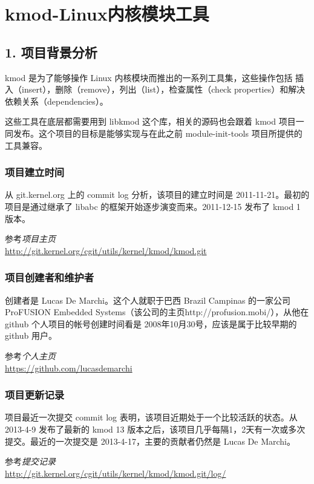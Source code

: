 \documentclass[11pt,a4paper]{article}
\begin{document}
\section{kmod-Linux内核模块工具}

\subsection{1. 项目背景分析}

kmod 是为了能够操作 Linux 内核模块而推出的一系列工具集，这些操作包括
插入（insert），删除（remove），列出（list），检查属性（check
properties）和解决依赖关系（dependencies）。

这些工具在底层都需要用到 libkmod 这个库，相关的源码也会跟着 kmod
项目一同发布。这个项目的目标是能够实现与在此之前 module-init-tools
项目所提供的工具兼容。

\subsubsection{项目建立时间}

从 git.kernel.org 上的 commit log 分析，该项目的建立时间是
2011-11-21。最初的项目是通过继承了 libabc
的框架开始逐步演变而来。2011-12-15 发布了 kmod 1 版本。

参考\emph{项目主页}\\\url{http://git.kernel.org/cgit/utils/kernel/kmod/kmod.git}

\subsubsection{项目创建者和维护者}

创建者是 Lucas De Marchi。这个人就职于巴西 Brazil Campinas
的一家公司ProFUSION Embedded
Systems（该公司的主页http://profusion.mobi/），从他在 github
个人项目的帐号创建时间看是 2008年10月30号，应该是属于比较早期的 github
用户。

参考\emph{个人主页}\\\url{https://github.com/lucasdemarchi}

\subsubsection{项目更新记录}

项目最近一次提交 commit log 表明，该项目近期处于一个比较活跃的状态。从
2013-4-9 发布了最新的 kmod 13
版本之后，该项目几乎每隔1，2天有一次或多次提交。最近的一次提交是
2013-4-17，主要的贡献者仍然是 Lucas De Marchi。

参考\emph{提交记录}\\\url{http://git.kernel.org/cgit/utils/kernel/kmod/kmod.git/log/}
\end{document}
